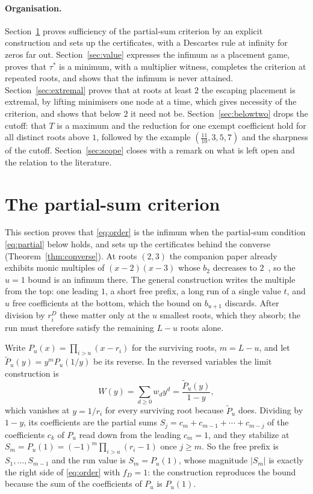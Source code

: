 \documentclass[11pt]{article}
\theoremstyle{definition}
\theoremstyle{plain}
\begin{document}
\paragraph{Organisation.}  Section~\ref{sec:criterion} proves sufficiency
of the partial-sum criterion by an explicit construction and sets up the
certificates, with a Descartes rule at infinity for zeros far out.
Section~\ref{sec:value} expresses the infimum as a placement game, proves
that $\tau^*$ is a minimum, with a multiplier witness, completes the criterion
at repeated roots, and shows that the infimum is never attained.
Section~\ref{sec:extremal} proves that at roots at least $2$ the escaping
placement is extremal, by lifting minimisers one node at a time, which
gives necessity of the criterion, and shows that below $2$ it need not be.  Section~\ref{sec:belowtwo} drops the
cutoff: that $T$ is a maximum and the reduction for one exempt coefficient hold
for all distinct roots above $1$, followed by the example
$(\tfrac{11}{10},3,5,7)$ and the sharpness of the cutoff.  Section~\ref{sec:scope} closes with a remark
on what is left open and the relation to the literature.

\section{The partial-sum criterion}\label{sec:criterion}

This section proves that \eqref{eq:order} is the infimum when the
partial-sum condition \eqref{eq:partial} below holds, and sets up the
certificates behind the converse (Theorem~\ref{thm:converse}).  At roots $(2,3)$ the
companion paper already exhibits monic multiples of $(x-2)(x-3)$ whose
$b_2$ decreases to $2$~\cite[Proposition~4.4]{coefficient-mass}, so the $u=1$
bound is an infimum there.  The general construction writes the multiple
from the top: one leading $1$, a short free prefix, a long run of a single
value $t$, and $u$ free coefficients at the bottom, which the bound on
$b_{u+1}$ discards.  After division by
$r_i^D$ these matter only at the $u$ smallest roots,
which they absorb; the run must therefore satisfy the remaining $L-u$ roots
alone.

Write $P_u(x)=\prod_{i>u}(x-r_i)$ for the
surviving roots, $m=L-u$, and let $\widetilde P_u(y)=y^mP_u(1/y)$ be its
reverse.  In the reversed variables the limit construction is
\begin{equation}\label{eq:wgen}
  W(y)=\sum_{d\ge0}w_dy^d=\frac{\widetilde P_u(y)}{1-y},
\end{equation}
which vanishes at $y=1/r_i$ for every surviving root because
$\widetilde P_u$ does.  Dividing by $1-y$, its coefficients are the partial sums
$S_j=c_m+c_{m-1}+\cdots+c_{m-j}$ of the coefficients $c_k$ of $P_u$ read down
from the leading $c_m=1$, and they stabilize at
$S_m=P_u(1)=(-1)^m\prod_{i>u}(r_i-1)$ once $j\ge m$.  So the free prefix is
$S_1,\ldots,S_{m-1}$ and the run value is $S_m=P_u(1)$, whose magnitude
$|S_m|$ is exactly the right side of \eqref{eq:order} with $f_D=1$: the construction reproduces the bound because the sum of the
coefficients of $P_u$ is $P_u(1)$.
\end{document}
